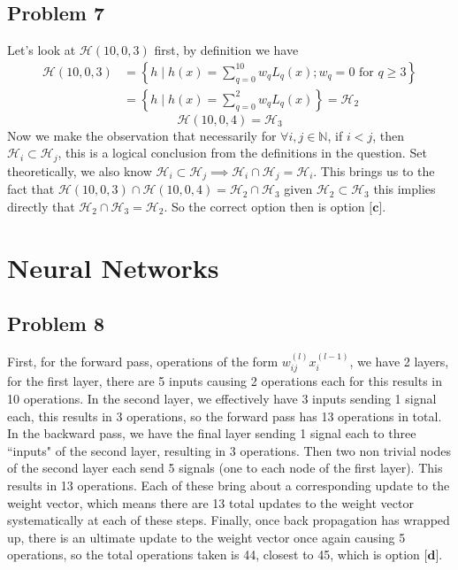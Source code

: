 \documentclass{article}
\begin{document}
\subsection*{Problem 7}
Let's look at $\mathcal{H}(10, 0, 3)$ first, by definition we have
\begin{align*}
\mathcal{H}(10,0,3)&=\left\{h \mid h(x)=\sum_{q=0}^{10} w_q L_q(x); w_q=0 \text { for } q \geq 3\right\}\\
&=\left\{h \mid h(x)=\sum_{q=0}^2 w_q L_q(x)\right\} = \mathcal{H}_2
\end{align*}
\begin{equation*}
    \mathcal{H}(10, 0, 4) = \mathcal{H}_3
\end{equation*}
Now we make the observation that necessarily for $\forall i, j \in\mathbb{N}$, if $i < j$, then $\mathcal{H}_{i} \subset \mathcal{H}_{j}$, this is a logical conclusion from the definitions in the question. Set theoretically, we also know $\mathcal{H}_{i} \subset \mathcal{H}_{j} \implies \mathcal{H}_{i} \cap \mathcal{H}_{j} = \mathcal{H}_{i}$. This brings us to the fact that $\mathcal{H}(10, 0, 3) \cap \mathcal{H}(10, 0, 4) = \mathcal{H}_{2} \cap \mathcal{H}_{3}$ given $\mathcal{H}_{2} \subset \mathcal{H}_{3}$ this implies directly that $\mathcal{H}_{2} \cap \mathcal{H}_{3} = \mathcal{H}_2$. So the correct option then is option $\textbf{[c]}$.
\section*{Neural Networks}
\subsection*{Problem 8}
First, for the forward pass, operations of the form $w_{ij}^{(l)}x_{i}^{(l-1)}$, we  have 2 layers, for the first layer, there are 5 inputs causing 2 operations each for this results in 10 operations. In the second layer, we effectively have 3 inputs sending 1 signal each, this results in 3 operations, so the forward pass has 13 operations in total. In the backward pass, we have the final layer sending 1 signal each to three ``inputs" of the second layer, resulting in 3 operations. Then two non trivial nodes of the second layer each send 5 signals (one to each node of the first layer). This results in 13 operations. Each of these bring about a corresponding update to the weight vector, which means there are 13 total updates to the weight vector systematically at each of these steps. Finally, once back propagation has wrapped up, there is an ultimate update to the weight vector once again causing 5 operations, so the total operations taken is 44, closest to 45, which is option  $\textbf{[d]}$. 
\end{document}
